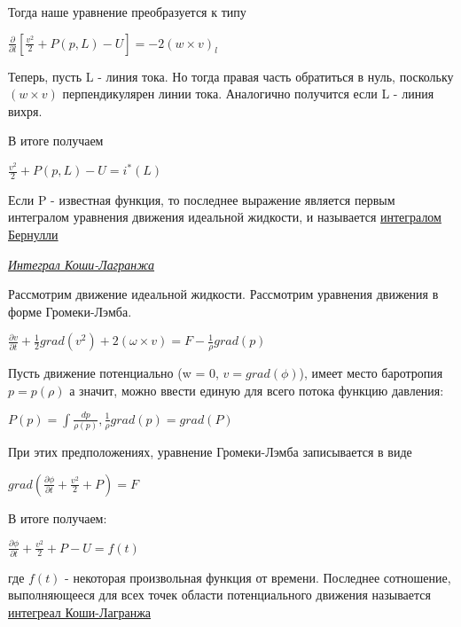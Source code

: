 Тогда наше уравнение преобразуется к типу
\begin{center}
	$\frac{\partial}{\partial l}[ \frac{v^2}{2} + P(p,L) - U] = -2(w\times v)_l$
\end{center}
Теперь, пусть L - линия тока. Но тогда правая часть обратиться в нуль, поскольку $(w\times v)$ перпендикулярен линии тока. Аналогично получится если L - линия вихря.


В итоге получаем 
\begin{center}
	$\frac{v^2}{2} + P(p,L) - U = i^*(L)$
\end{center}
Если P - известная функция, то последнее выражение является первым интегралом уравнения движения идеальной жидкости, и называется \underline{интегралом Бернулли}
\begin{center}
	\textit{\underline{Интеграл Коши-Лагранжа}}
\end{center}
Рассмотрим движение идеальной жидкости. Рассмотрим уравнения движения в форме Громеки-Лэмба.
\begin{center}
	$\frac{\partial v}{\partial t} + \frac{1}{2}grad(v^2) + 2(\omega\times v) = F - \frac{1}{\rho}grad(p)$
\end{center}
Пусть движение потенциально (w = 0, $v = grad(\phi)$), имеет место баротропия $p = p(\rho)$ а значит, можно ввести единую для всего потока функцию давления:
\begin{center}
	$P(p) = \int \frac{dp}{\rho(p)}, \frac{1}{\rho}grad(p) = grad(P)$
\end{center}
При этих предположениях, уравнение Громеки-Лэмба записывается в виде
\begin{center}
	$grad(\frac{\partial\phi}{\partial t} + \frac{v^2}{2} + P) = F$
\end{center}
В итоге получаем:
\begin{center}
	$\frac{\partial\phi}{\partial t} + \frac{v^2}{2} + P - U = f(t)$
\end{center}
где $f(t)$ - некоторая произвольная функция от времени.
Последнее сотношение, выполняющееся для всех точек области потенциального движения называется \underline{интегреал Коши-Лагранжа}